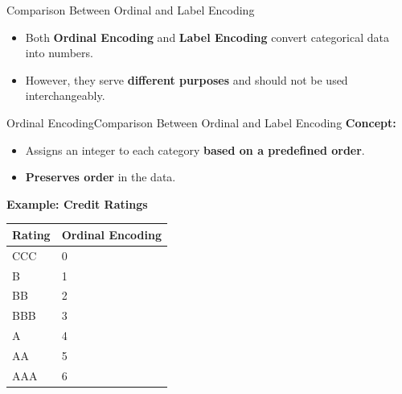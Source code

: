 \documentclass[11pt]{beamer}
\begin{document}
%
%
\begin{frame}{Comparison Between Ordinal and Label Encoding}
    \begin{itemize}
        \item Both \textbf{Ordinal Encoding} and \textbf{Label Encoding} convert categorical data into numbers.
        \item However, they serve \textbf{different purposes} and should not be used interchangeably.
    \end{itemize}
\end{frame}
%
%
\begin{frame}{Ordinal Encoding}{Comparison Between Ordinal and Label Encoding}
    \textbf{Concept:}
    \begin{itemize}
        \item Assigns an integer to each category \textbf{based on a predefined order}.
        \item \textbf{Preserves order} in the data.
    \end{itemize}
    \vspace{0.3cm}
    \textbf{Example: Credit Ratings}
    \begin{table}[]
        \centering
        \begin{tabular}{ll}
            \toprule
            \textbf{Rating} & \textbf{Ordinal Encoding} \\
            \midrule
            CCC & 0 \\
            B   & 1 \\
            BB  & 2 \\
            BBB & 3 \\
            A   & 4 \\
            AA  & 5 \\
            AAA & 6 \\
            \bottomrule
        \end{tabular}
    \end{table}
\end{frame}
%
%
\end{document}
